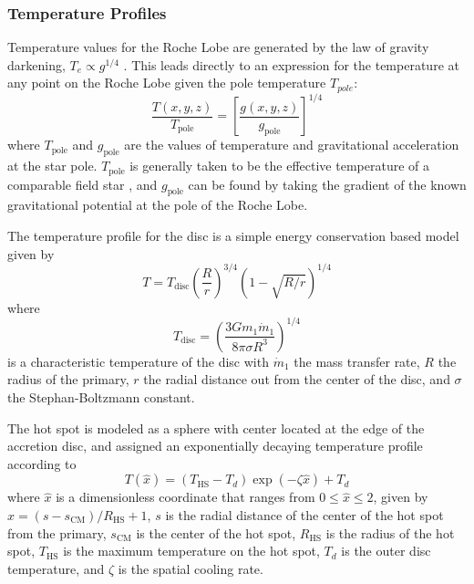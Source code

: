 \documentclass[preprint2]{aastex}
\begin{document}
\subsubsection{Temperature Profiles}
Temperature values for the Roche Lobe are generated by the law of
gravity darkening, $T_e \propto g^{1/4}$
\citep{1967ZA.....65...89L,1924MNRAS..84..665V}. This leads directly
to an expression for the temperature at any point on the Roche Lobe given the pole temperature $T_{pole}$:
\begin{equation}
   \dfrac{T(x,y,z)}{T_{\text{pole}}} = \left
   [\dfrac{g(x,y,z)}{g_{\text{pole}}}\right ]^{1/4}
\end{equation}
where $T_{\text{pole}}$ and $g_{\text{pole}}$ are the values of
temperature and gravitational acceleration at the star pole.
$T_{\text{pole}}$ is generally taken to be the effective temperature
of a comparable field star \citep{1997ApJ...477..876O}, and
$g_{\text{pole}}$ can be found by taking the gradient of the known
gravitational potential at the pole of the Roche Lobe.

The temperature profile for the disc is a simple energy conservation
based model given by
\begin{equation}
   T = T_{\text{disc}}\left (\dfrac{R}{r} \right )^{3/4} \left (1 -
   \sqrt{R/r} \right )^{1/4}
\end{equation}
where
\begin{equation}
   T_{\text{disc}} = \left ( \dfrac{3Gm_1\dot{m}_{1}}{8\pi \sigma R^{3}}
   \right )^{1/4}
\end{equation}
is a characteristic temperature of the disc with $\dot{m}_{1}$ the mass
transfer rate, $R$ the radius of the primary, $r$ the radial distance out from the center of the disc, and $\sigma$ the
Stephan-Boltzmann constant.

The hot spot is modeled as a sphere with center located at the edge
of the accretion disc, and assigned an exponentially decaying
temperature profile according to
\begin{equation}
   T(\hat{x}) = (T_{\text{HS}} - T_d)\exp \left ( -\zeta \hat{x}\right )
   + T_d
\end{equation}
where $\hat{x}$ is a dimensionless coordinate that ranges from $0 \le
\hat{x} \le 2$, given by $\hat{x} = (s - s_{\text{CM}})/R_{\text{HS}}
+ 1$, $s$ is the radial distance of the center of the hot spot from
the primary, $s_{\text{CM}}$ is the center of the hot spot,
$R_{\text{HS}}$ is the radius of the hot spot, $T_{\text{HS}}$ is the
maximum temperature on the hot spot, $T_d$ is the outer disc
temperature, and $\zeta$ is the spatial cooling rate. 
\end{document}
